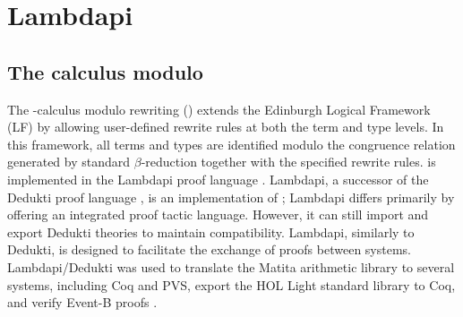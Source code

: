 \chapter{Lambdapi}\label{ch:intro-lambdapi}

\section{The \texorpdfstring{\lp}-calculus modulo}

The \lp-calculus modulo rewriting (\lpm)\index{$\lpm$}  extends the Edinburgh Logical Framework (LF) \cite{lf} by allowing user-defined rewrite rules at both the term and type levels.
In this framework, all terms and types are identified modulo the congruence relation generated by standard $\beta$-reduction together with the specified rewrite rules.
{\lpm} is implemented in the Lambdapi proof language \cite{lambdapi}. Lambdapi, a successor of the Dedukti proof language \cite{Dedukti-ref, Dedukti-ref2}, is an implementation of {\lpm}; Lambdapi differs primarily by offering an integrated proof tactic language.
However, it can still import and export Dedukti theories to maintain compatibility. Lambdapi, similarly to Dedukti, is designed to facilitate the exchange of proofs between systems.
Lambdapi/Dedukti was used to translate \cite{thire:tel-03224039} the Matita arithmetic library to several systems, including Coq and PVS, export \cite{blanqui:hal-04613926} the HOL Light standard library to Coq,
and verify Event-B proofs \cite{eventb2lp}.



